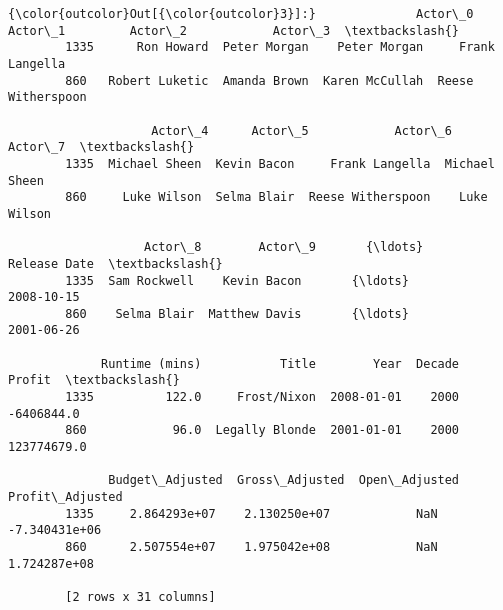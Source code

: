 \documentclass[11pt]{article}
\begin{document}
            \begin{Verbatim}[commandchars=\\\{\}]
{\color{outcolor}Out[{\color{outcolor}3}]:}              Actor\_0       Actor\_1         Actor\_2            Actor\_3  \textbackslash{}
        1335      Ron Howard  Peter Morgan    Peter Morgan     Frank Langella   
        860   Robert Luketic  Amanda Brown  Karen McCullah  Reese Witherspoon   
        
                    Actor\_4      Actor\_5            Actor\_6        Actor\_7  \textbackslash{}
        1335  Michael Sheen  Kevin Bacon     Frank Langella  Michael Sheen   
        860     Luke Wilson  Selma Blair  Reese Witherspoon    Luke Wilson   
        
                   Actor\_8        Actor\_9       {\ldots}         Release Date  \textbackslash{}
        1335  Sam Rockwell    Kevin Bacon       {\ldots}           2008-10-15   
        860    Selma Blair  Matthew Davis       {\ldots}           2001-06-26   
        
             Runtime (mins)           Title        Year  Decade       Profit  \textbackslash{}
        1335          122.0     Frost/Nixon  2008-01-01    2000   -6406844.0   
        860            96.0  Legally Blonde  2001-01-01    2000  123774679.0   
        
              Budget\_Adjusted  Gross\_Adjusted  Open\_Adjusted  Profit\_Adjusted  
        1335     2.864293e+07    2.130250e+07            NaN    -7.340431e+06  
        860      2.507554e+07    1.975042e+08            NaN     1.724287e+08  
        
        [2 rows x 31 columns]
\end{Verbatim}
        
\end{document}
